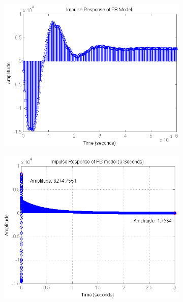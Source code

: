 \begin{figure}[H]
\centering
\begin{subfigure}[b]{0.5\textwidth}
\includegraphics[width=1.0\textwidth]{pics/impulse_FB}
\caption{}
\label{pic:}
\end{subfigure}\;\begin{subfigure}[b]{0.5\textwidth}
\includegraphics[width=1.0\textwidth]{pics/impulse_FB_3sec}
\caption{}
\label{pic:}
\end{subfigure}

\end{figure}

